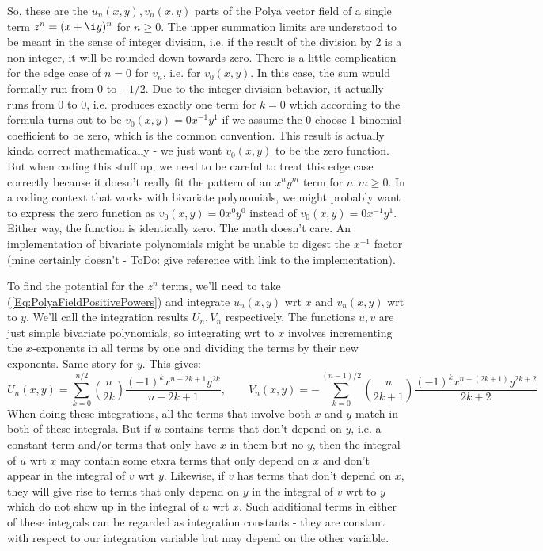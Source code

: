\documentclass[12pt]{article}
\begin{document}
So, these are the $u_n(x,y), v_n(x,y)$ parts of the Polya vector field of a single term $z^n = (x + \i y)^n$ for $n \geq 0$. The upper summation limits are understood to be meant in the sense of integer division, i.e. if the result of the division by 2 is a non-integer, it will be rounded down towards zero. There is a little complication for the edge case of $n=0$ for $v_n$, i.e. for $v_0(x,y)$. In this case, the sum would formally run from $0$ to $-1/2$. Due to the integer division behavior, it actually runs from $0$ to $0$, i.e. produces exactly one term for $k=0$ which according to the formula turns out to be $v_0(x,y) = 0 x^{-1} y^1$ if we assume the 0-choose-1 binomial coefficient to be zero, which is the common convention. This result is actually kinda correct mathematically - we just want $v_0(x,y)$ to be the zero function. But when coding this stuff up, we need to be careful to treat this edge case correctly because it doesn't really fit the pattern of an $x^n y^m$ term for $n,m \geq 0$. In a coding context that works with bivariate polynomials, we might probably want to express the zero function as $v_0(x,y) = 0 x^0 y^0$ instead of $v_0(x,y) = 0 x^{-1} y^1$. Either way, the function is identically zero. The math doesn't care. An implementation of bivariate polynomials might be unable to digest the $x^{-1}$ factor (mine certainly doesn't - ToDo: give reference with link to the implementation).

\medskip
To find the potential for the $z^n$ terms, we'll need to take (\ref{Eq:PolyaFieldPositivePowers}) and integrate $u_n(x,y)$ wrt $x$ and $v_n(x,y)$ wrt to $y$. We'll call the integration results $U_n, V_n$ respectively. The functions $u,v$ are just simple bivariate polynomials, so integrating wrt to $x$ involves incrementing the $x$-exponents in all terms by one and dividing the terms by their new exponents. Same story for $y$. This gives:
\begin{equation}
U_n(x,y) = \sum_{k=0}^{n/2} \binom{n}{2 k} \frac{(-1)^k x^{n-2k+1} y^{2k}}{n-2k+1}
,\qquad
V_n(x,y) = -\sum_{k=0}^{(n-1)/2} \binom{n}{2k+1} \frac{(-1)^k x^{n-(2k+1)} y^{2k+2}}{2k+2}
\end{equation}
When doing these integrations, all the terms that involve both $x$ and $y$ match in both of these integrals. But if $u$ contains terms that don't depend on $y$, i.e. a constant term and/or terms that only have $x$ in them but no $y$, then the integral of $u$ wrt $x$ may contain some etxra terms that only depend on $x$ and don't appear in the integral of $v$ wrt $y$. Likewise, if $v$ has terms that don't depend on $x$, they will give rise to terms that only depend on $y$ in the integral of $v$ wrt to $y$ which do not show up in the integral of $u$ wrt $x$. Such additional terms in either of these integrals can be regarded as integration constants - they are constant with respect to our integration variable but may depend on the other variable.
\end{document}
